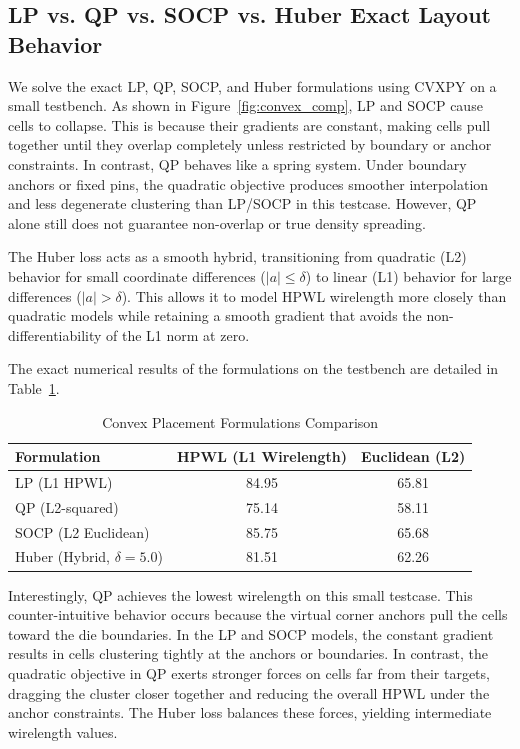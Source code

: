 \documentclass[10pt, twocolumn]{article}
\begin{document}
\subsection{LP vs. QP vs. SOCP vs. Huber Exact Layout Behavior}
We solve the exact LP, QP, SOCP, and Huber formulations using CVXPY on a small testbench. As shown in Figure~\ref{fig:convex_comp}, LP and SOCP cause cells to collapse. This is because their gradients are constant, making cells pull together until they overlap completely unless restricted by boundary or anchor constraints. In contrast, QP behaves like a spring system. Under boundary anchors or fixed pins, the quadratic objective produces smoother interpolation and less degenerate clustering than LP/SOCP in this testcase. However, QP alone still does not guarantee non-overlap or true density spreading.

The Huber loss acts as a smooth hybrid, transitioning from quadratic (L2) behavior for small coordinate differences ($|a| \le \delta$) to linear (L1) behavior for large differences ($|a| > \delta$). This allows it to model HPWL wirelength more closely than quadratic models while retaining a smooth gradient that avoids the non-differentiability of the L1 norm at zero.

The exact numerical results of the formulations on the testbench are detailed in Table~\ref{tab:convex_formulations}.

\begin{table}[htbp]
\centering
\caption{Convex Placement Formulations Comparison}
\label{tab:convex_formulations}
\begin{tabular}{lcc}
\toprule
Formulation & HPWL (L1 Wirelength) & Euclidean (L2) \\
\midrule
LP (L1 HPWL) & 84.95 & 65.81 \\
QP (L2-squared) & 75.14 & 58.11 \\
SOCP (L2 Euclidean) & 85.75 & 65.68 \\
Huber (Hybrid, $\delta=5.0$) & 81.51 & 62.26 \\
\bottomrule
\end{tabular}
\end{table}

Interestingly, QP achieves the lowest wirelength on this small testcase. This counter-intuitive behavior occurs because the virtual corner anchors pull the cells toward the die boundaries. In the LP and SOCP models, the constant gradient results in cells clustering tightly at the anchors or boundaries. In contrast, the quadratic objective in QP exerts stronger forces on cells far from their targets, dragging the cluster closer together and reducing the overall HPWL under the anchor constraints. The Huber loss balances these forces, yielding intermediate wirelength values.
\end{document}
